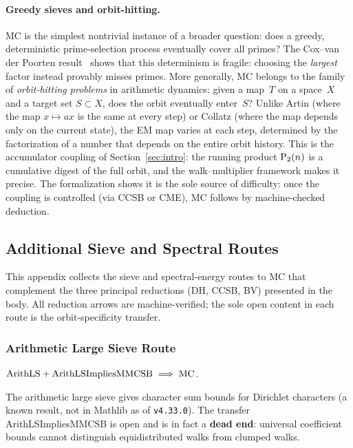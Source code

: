 \paragraph{Greedy sieves and orbit-hitting.}
MC is the simplest nontrivial instance of a broader question: does a
greedy, deterministic prime-selection process eventually cover all
primes?  The Cox--van der Poorten result~\cite{CoxVdP1968} shows that this
determinism is fragile: choosing the \emph{largest} factor instead
provably misses primes.  More generally, MC belongs to the family of
\emph{orbit-hitting problems} in arithmetic dynamics: given a map~$T$
on a space~$X$ and a target set $S \subset X$, does the orbit
eventually enter~$S$?  Unlike Artin (where the map $x \mapsto ax$ is
the same at every step) or Collatz (where the map depends only on the
current state), the EM map varies at each step, determined by the
factorization of a number that depends on the entire orbit history.
This is the accumulator coupling of Section~\ref{sec:intro}: the
running product $\mathrm{P}_{2}(n)$ is a cumulative digest of the full orbit,
and the walk--multiplier framework makes it precise.  The
formalization shows it is the sole source of difficulty: once the
coupling is controlled (via CCSB or CME), MC follows by
machine-checked deduction.

\subsection{Additional Sieve and Spectral Routes}
\label{app:routes}

This appendix collects the sieve and spectral-energy routes to MC that
complement the three principal reductions (DH, CCSB, BV) presented in
the body.  All reduction arrows are machine-verified; the sole open
content in each route is the orbit-specificity transfer.

\subsubsection*{Arithmetic Large Sieve Route}

\begin{theorem}
$\mathrm{ArithLS} + \mathrm{ArithLSImpliesMMCSB} \;\Longrightarrow\; \mathrm{MC}$.
\end{theorem}
The arithmetic large sieve gives character sum bounds for Dirichlet
characters (a known result, not in Mathlib as of \texttt{v4.33.0}).  The transfer
ArithLSImpliesMMCSB is open and is in fact a \textbf{dead
end}: universal coefficient bounds cannot distinguish equidistributed
walks from clumped walks.

